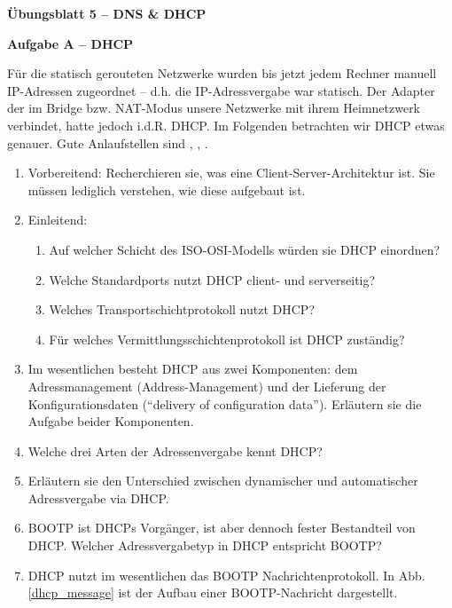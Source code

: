 \documentclass[paper=a4,fontsize=11pt]{scrartcl}%
\numberwithin{equation}{section}
\begin{document}
\begin{center}
\Large{\textbf{Übungsblatt 5 -- DNS \& DHCP}}
\end{center}

\begin{center} \Large{\textbf{Aufgabe A -- DHCP}} \end{center} \vskip0.25in
Für die statisch gerouteten Netzwerke wurden bis jetzt jedem Rechner manuell IP-Adressen zugeordnet -- d.h. die IP-Adressvergabe war statisch. Der Adapter der im Bridge bzw. NAT-Modus unsere Netzwerke mit ihrem Heimnetzwerk verbindet, hatte jedoch i.d.R. DHCP. Im Folgenden betrachten wir DHCP etwas genauer. Gute Anlaufstellen sind \cite[Kap. 4.4, S. 345ff]{Kurose2012}, \cite[Kap. 6, S. 233ff]{fall2011tcp}, \cite[Kap. 60, S. 977ff]{kozierok2005tcp}.
\begin{enumerate}
	\item Vorbereitend: Recherchieren sie, was eine Client-Server-Architektur ist. Sie müssen lediglich verstehen, wie diese aufgebaut ist.
	\item Einleitend:
	\begin{enumerate}
		\item Auf welcher Schicht des ISO-OSI-Modells würden sie DHCP einordnen?
		\item Welche Standardports nutzt DHCP client- und serverseitig?
		\item Welches Transportschichtprotokoll nutzt DHCP?
		\item Für welches Vermittlungsschichtenprotokoll ist DHCP zuständig?
	\end{enumerate}
	\item Im wesentlichen besteht DHCP aus zwei Komponenten: dem Adressmanagement (Address-Management) und der Lieferung der Konfigurationsdaten (\enquote{delivery of configuration data}). Erläutern sie die Aufgabe beider Komponenten.
	\item Welche drei Arten der Adressenvergabe kennt DHCP?
	\item Erläutern sie den Unterschied zwischen dynamischer und automatischer Adressvergabe via DHCP.
	\item BOOTP ist DHCPs Vorgänger, ist aber dennoch fester Bestandteil von DHCP. Welcher Adressvergabetyp in DHCP entspricht BOOTP?
	\item DHCP nutzt im wesentlichen das BOOTP Nachrichtenprotokoll. In Abb. \ref{dhcp_message} ist der Aufbau einer BOOTP-Nachricht dargestellt.
	\begin{figure}[H]
	\centering

\end{figure}
\end{enumerate}
\end{document}
